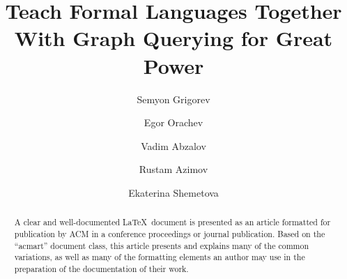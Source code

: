 \documentclass[sigconf]{acmart}
\begin{document}
\title{Teach Formal Languages Together With Graph Querying for Great Power}

\author{Semyon Grigorev}

\author{Egor Orachev}

\author{Vadim Abzalov}

\author{Rustam Azimov}

\author{Ekaterina Shemetova}

\renewcommand{\shortauthors}{Trovato and Tobin, et al.}

\begin{abstract}
  A clear and well-documented \LaTeX\ document is presented as an
  article formatted for publication by ACM in a conference proceedings
  or journal publication. Based on the ``acmart'' document class, this
  article presents and explains many of the common variations, as well
  as many of the formatting elements an author may use in the
  preparation of the documentation of their work.
\end{abstract}
\end{document}
